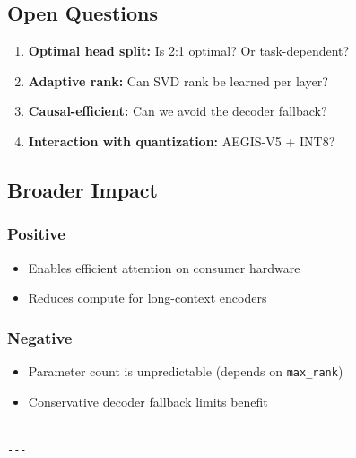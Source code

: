 \subsection{Open Questions}

\begin{enumerate}
\item \textbf{Optimal head split:} Is 2:1 optimal? Or task-dependent?
\item \textbf{Adaptive rank:} Can SVD rank be learned per layer?
\item \textbf{Causal-efficient:} Can we avoid the decoder fallback?
\item \textbf{Interaction with quantization:} AEGIS-V5 + INT8?

\end{enumerate}
\subsection{Broader Impact}

\subsubsection{Positive}
\begin{itemize}
\item Enables efficient attention on consumer hardware
\item Reduces compute for long-context encoders

\end{itemize}
\subsubsection{Negative}
\begin{itemize}
\item Parameter count is unpredictable (depends on \texttt{max\_rank})
\item Conservative decoder fallback limits benefit
\end{itemize}
\begin{lstlisting}

---
\end{lstlisting}